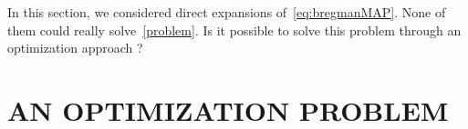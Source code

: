 \documentclass[twoside]{article}
\let\oldsection\section
\renewcommand{\section}[1]{\oldsection{\texorpdfstring{\uppercase{#1}}{#1}}}
\newcommand{\rlp}[1]{\textcolor{BrickRed}{(RLP:#1)}}
\newcommand{\logpart}{A}
\newcommand{\bregman}{\cB_\logpart}
\newcommand{\nat}{\theta}
\newcommand{\m}{\mu}
\newcommand{\lr}{\gamma} %
\begin{document}
In this section, we considered direct expansions of~\eqref{eq:bregmanMAP}.
None of them could really solve~\eqref{problem}. 
Is it possible to solve this problem through an optimization approach ?


\section{AN OPTIMIZATION PROBLEM}
\label{sec:optimization}

%
\end{document}
